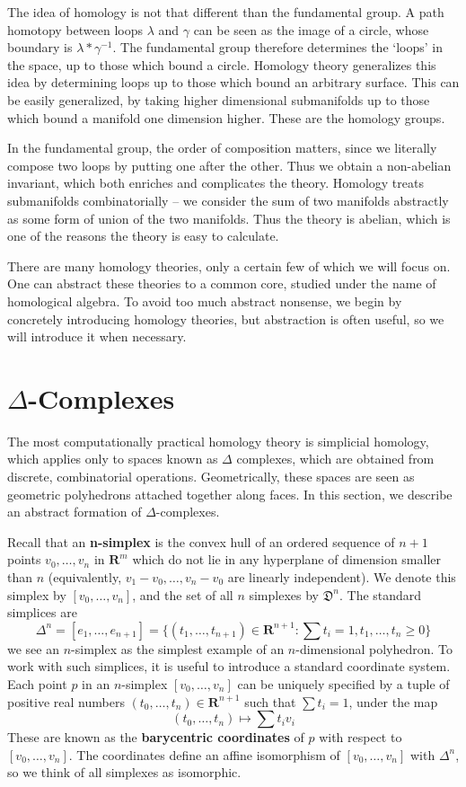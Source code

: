 The idea of homology is not that different than the fundamental group. A path homotopy between loops $\lambda$ and $\gamma$ can be seen as the image of a circle, whose boundary is $\lambda * \gamma^{-1}$. The fundamental group therefore determines the `loops' in the space, up to those which bound a circle. Homology theory generalizes this idea by determining loops up to those which bound an arbitrary surface. This can be easily generalized, by taking higher dimensional submanifolds up to those which bound a manifold one dimension higher. These are the homology groups.

In the fundamental group, the order of composition matters, since we literally compose two loops by putting one after the other. Thus we obtain a non-abelian invariant, which both enriches and complicates the theory. Homology treats submanifolds combinatorially -- we consider the sum of two manifolds abstractly as some form of union of the two manifolds. Thus the theory is abelian, which is one of the reasons the theory is easy to calculate.

There are many homology theories, only a certain few of which we will focus on. One can abstract these theories to a common core, studied under the name of homological algebra. To avoid too much abstract nonsense, we begin by concretely introducing homology theories, but abstraction is often useful, so we will introduce it when necessary.

\section{$\Delta$-Complexes}

The most computationally practical homology theory is simplicial homology, which applies only to spaces known as $\Delta$ complexes, which are obtained from discrete, combinatorial operations. Geometrically, these spaces are seen as geometric polyhedrons attached together along faces. In this section, we describe an abstract formation of $\Delta$-complexes.

Recall that an {\bf n-simplex} is the convex hull of an ordered sequence of $n+1$ points $v_0, \dots, v_n$ in $\mathbf{R}^m$ which do not lie in any hyperplane of dimension smaller than $n$ (equivalently, $v_1 - v_0, \dots, v_n - v_0$ are linearly independent). We denote this simplex by $[v_0, \dots, v_n]$, and the set of all $n$ simplexes by $\mathfrak{D}^n$. The standard simplices are
%
\[ \Delta^n = [e_1, \dots, e_{n+1}] = \{ (t_1, \dots, t_{n+1}) \in \mathbf{R}^{n+1} : \sum t_i = 1, t_1, \dots, t_n \geq 0 \} \]
%
we see an $n$-simplex as the simplest example of an $n$-dimensional polyhedron. To work with such simplices, it is useful to introduce a standard coordinate system. Each point $p$ in an $n$-simplex $[v_0, \dots, v_n]$ can be uniquely specified by a tuple of positive real numbers $(t_0, \dots, t_n) \in \mathbf{R}^{n+1}$ such that $\sum t_i = 1$, under the map
%
\[ (t_0, \dots, t_n) \mapsto \sum t_i v_i \]
%
These are known as the {\bf barycentric coordinates} of $p$ with respect to $[v_0, \dots, v_n]$. The coordinates define an affine isomorphism of $[v_0, \dots, v_n]$ with $\Delta^n$, so we think of all simplexes as isomorphic.

